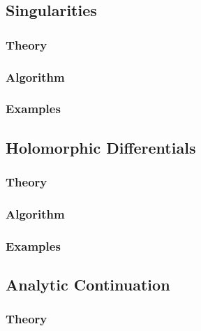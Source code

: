 \documentclass[10pt,twoside]{article}
\theoremstyle{plain}
\theoremstyle{definition}
\numberwithin{equation}{section}
\begin{document}
\subsection{Singularities}

%
\subsubsection*{Theory}
%
%
\subsubsection*{Algorithm}
%
%
\subsubsection*{Examples}
%

\subsection{Holomorphic Differentials}

%
\subsubsection*{Theory}
%



%
\subsubsection*{Algorithm}
%
%
\subsubsection*{Examples}
%

\subsection{Analytic Continuation}

%
\subsubsection*{Theory}
%
\end{document}
